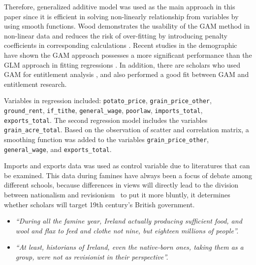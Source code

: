 Therefore, generalized additive model was used as the main approach in this paper since it is efficient in solving non-linearly relationship from variables by using smooth functions. Wood demonstrates the usability of the GAM method in non-linear data and reduces the risk of over-fitting by introducing penalty coefficients in corresponding calculations \citep{wood2001mgcv}. Recent studies in the demographic have shown the GAM approach possesses a more significant performance than the GLM approach in fitting regressions \citep{potts2018evaluation}. In addition, there are scholars who used GAM for entitlement analysis \citep{ardyanto2006granting}, and also performed a good fit between GAM and entitlement research.

Variables in regression included: \texttt{potato\_price}, \texttt{grain\_price\_other}, \texttt{ground\_rent}, \texttt{if\_tithe}, \texttt{general\_wage}, \texttt{poorlaw}, \texttt{imports\_total}, \texttt{exports\_total}. The second regression model includes the variables \texttt{grain\_acre\_total}. Based on the observation of scatter and correlation matrix, a smoothing function was added to the variables \texttt{grain\_price\_other}, \texttt{general\_wage}, and \texttt{exports\_total}. 

Imports and exports data was used as control variable due to literatures that can be examined. This data during famines have always been a focus of debate among different schools, because differences in views will directly lead to the division between nationalism and revisionism \textemdash\ to put it more bluntly, it determines whether scholars will target 19th century's British government. 

\begin{itemize}
    \item [] \textit{``During all the famine year, Ireland actually producing sufficient food, and wool and flax to feed and clothe not nine, but eighteen millions of people''.} \citep{mitchel1905apology}
    \item [] \textit{``At least, historians of Ireland, even the native-born ones, taking them as a group, were not as revisionist in their perspective''.}\citep{donnelly1996construction}
\end{itemize}

